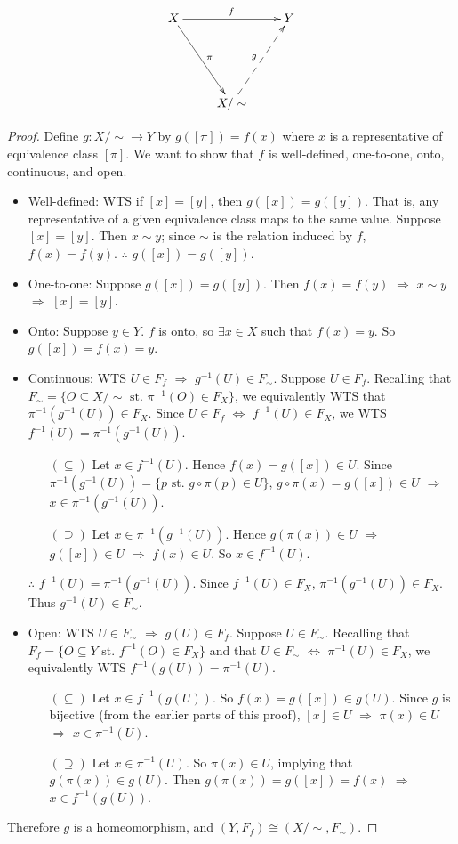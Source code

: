 \[ \xymatrix{ X \ar[rr]^f \ar[ddr]^\pi & & Y \\
\\
& X/\sim \ar@{-->}[uur]^g } \]
\begin{proof}
	Define $g \colon X/\sim \rightarrow Y$ by $g([\pi]) = f(x)$ where $x$ is a representative of equivalence class $[\pi]$. We want to show that $f$ is well-defined, one-to-one, onto, continuous, and open. 
	\begin{itemize}
		\item Well-defined: WTS if $[x]=[y]$, then $g([x])=g([y])$. That is, any representative of a given equivalence class maps to the same value. Suppose $[x]=[y]$. Then $x \sim y$; since $\sim$ is the relation induced by $f$, $f(x)=f(y)$. $\therefore$ $g([x])=g([y])$. 
		\item One-to-one: Suppose $g([x])=g([y])$. Then $f(x)=f(y)$ $\Rightarrow$ $x \sim y$ $\Rightarrow$ $[x]=[y]$. 
		\item Onto: Suppose $y \in Y$. $f$ is onto, so $\exists x \in X$ such that $f(x)=y$. So $g([x]) = f(x) = y$. 
		\item Continuous: WTS $U \in F_f$ $\Rightarrow$ $g^{-1}(U) \in F_\sim$. Suppose $U \in F_f$. Recalling that $F_\sim = \{ O \subseteq X/\sim \text{ st. } \pi^{-1}(O) \in F_X \}$, we equivalently WTS that $\pi^{-1}(g^{-1}(U)) \in F_X$. Since $U \in F_f$ $\Leftrightarrow$ $f^{-1}(U) \in F_X$, we WTS $f^{-1}(U) = \pi^{-1}(g^{-1}(U))$. 
		\begin{itemize}
			\item[$(\subseteq)$] Let $x \in f^{-1}(U)$. Hence $f(x) = g([x]) \in U$. Since $\pi^{-1}(g^{-1}(U)) = \{ p \text{ st. } g \circ \pi (p) \in U \}$, $g \circ \pi (x) = g([x]) \in U$ $\Rightarrow$ $x \in \pi^{-1}(g^{-1}(U))$. 
			\item[$(\supseteq)$] Let $x \in \pi^{-1}(g^{-1}(U))$. Hence $g(\pi(x)) \in U$ $\Rightarrow$ $g([x]) \in U$ $\Rightarrow$ $f(x) \in U$. So $x \in f^{-1}(U)$. 
		\end{itemize}
		$\therefore$ $f^{-1}(U) = \pi^{-1}(g^{-1}(U))$. Since $f^{-1}(U) \in F_X$, $\pi^{-1}(g^{-1}(U)) \in F_X$. Thus $g^{-1}(U) \in F_\sim$. 
		\item Open: WTS $U \in F_\sim$ $\Rightarrow$ $g(U) \in F_f$. Suppose $U \in F_\sim$. Recalling that $F_f = \{ O \subseteq Y \text{ st. } f^{-1}(O) \in F_X \}$ and that $U \in F_\sim$ $\Leftrightarrow$ $\pi^{-1}(U) \in F_X$, we equivalently WTS $f^{-1}(g(U)) = \pi^{-1}(U)$. 
		\begin{itemize}
			\item[$(\subseteq)$] Let $x \in f^{-1}(g(U))$. So $f(x)=g([x]) \in g(U)$. Since $g$ is bijective (from the earlier parts of this proof), $[x] \in U$ $\Rightarrow$ $\pi(x) \in U$ $\Rightarrow$ $x \in \pi^{-1}(U)$. 
			\item[$(\supseteq)$] Let $x \in \pi^{-1}(U)$. So $\pi(x) \in U$, implying that $g(\pi(x)) \in g(U)$. Then $g(\pi(x)) = g([x]) = f(x)$ $\Rightarrow$ $x \in f^{-1}(g(U))$. 
		\end{itemize}
	\end{itemize}
	Therefore $g$ is a homeomorphism, and $(Y,F_f) \cong (X/\sim,F_\sim)$. 
\end{proof}
